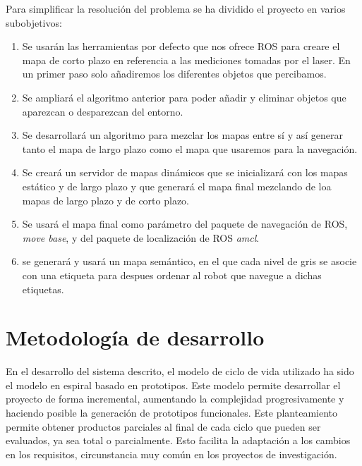 Para simplificar la resolución del problema se ha dividido el proyecto en varios subobjetivos:

\begin{enumerate}
\item Se usarán las herramientas por defecto que nos ofrece ROS para creare el mapa de corto plazo en referencia a las mediciones tomadas por el laser. En un primer paso solo añadiremos los diferentes objetos que percibamos.
\item Se ampliará el algoritmo anterior para poder añadir y eliminar objetos que aparezcan o desparezcan del entorno. 
\item Se desarrollará un algoritmo para mezclar los mapas entre sí y así generar tanto el mapa de largo plazo como el mapa que usaremos para la navegación.
\item Se creará un servidor de mapas dinámicos que se inicializará con los mapas estático y de largo plazo y que generará el mapa final mezclando de loa mapas de largo plazo y de corto plazo.
\item Se usará el mapa final como parámetro del paquete de navegación de ROS, \textit{move base}, y del paquete de localización de ROS \textit{amcl}.
\item se generará y usará un mapa semántico, en el que cada nivel de gris se asocie con una etiqueta para despues ordenar al robot que navegue a dichas etiquetas.
\end{enumerate}

\section{Metodología de desarrollo}
\label{sec:metodologiadedesarrollo}

En el desarrollo del sistema descrito, el modelo de ciclo de vida utilizado ha sido el modelo en espiral basado en prototipos. Este modelo permite desarrollar el proyecto de forma incremental, aumentando la complejidad progresivamente y haciendo posible la generación de prototipos funcionales. Este planteamiento permite obtener productos parciales al final de cada ciclo que pueden ser evaluados, ya sea total o parcialmente. Esto facilita la adaptación a los cambios en los requisitos, circunstancia muy común en los proyectos de investigación.\\

